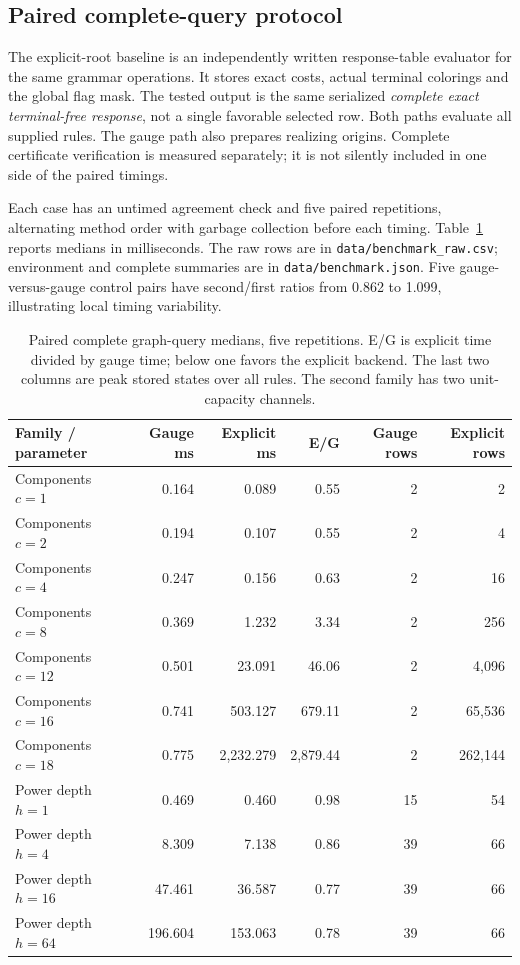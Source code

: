 \documentclass[11pt,letterpaper]{article}
\theoremstyle{definition}
\theoremstyle{remark}\newtheorem{remark}[theorem]{Remark}
\DeclareRobustCommand{\code}[1]{\nolinkurl{#1}}
\begin{document}
\subsection{Paired complete-query protocol}
The explicit-root baseline is an independently written response-table evaluator for the same grammar operations. It stores exact costs, actual terminal colorings and the global flag mask. The tested output is the same serialized \emph{complete exact terminal-free response}, not a single favorable selected row. Both paths evaluate all supplied rules. The gauge path also prepares realizing origins. Complete certificate verification is measured separately; it is not silently included in one side of the paired timings.

Each case has an untimed agreement check and five paired repetitions, alternating method order with garbage collection before each timing. Table~\ref{tab:timing} reports medians in milliseconds. The raw rows are in \code{data/benchmark_raw.csv}; environment and complete summaries are in \code{data/benchmark.json}. Five gauge-versus-gauge control pairs have second/first ratios from 0.862 to 1.099, illustrating local timing variability.

\begin{table}[htbp]
\centering\small
\setlength{\tabcolsep}{5pt}
\begin{tabular}{@{}lrrrrr@{}}
\toprule
Family / parameter & Gauge ms & Explicit ms & E/G & Gauge rows & Explicit rows\\
\midrule
Components $c=1$ & 0.164 & 0.089 & 0.55 & 2 & 2\\
Components $c=2$ & 0.194 & 0.107 & 0.55 & 2 & 4\\
Components $c=4$ & 0.247 & 0.156 & 0.63 & 2 & 16\\
Components $c=8$ & 0.369 & 1.232 & 3.34 & 2 & 256\\
Components $c=12$ & 0.501 & 23.091 & 46.06 & 2 & 4,096\\
Components $c=16$ & 0.741 & 503.127 & 679.11 & 2 & 65,536\\
Components $c=18$ & 0.775 & 2,232.279 & 2,879.44 & 2 & 262,144\\
\midrule
Power depth $h=1$ & 0.469 & 0.460 & 0.98 & 15 & 54\\
Power depth $h=4$ & 8.309 & 7.138 & 0.86 & 39 & 66\\
Power depth $h=16$ & 47.461 & 36.587 & 0.77 & 39 & 66\\
Power depth $h=64$ & 196.604 & 153.063 & 0.78 & 39 & 66\\
\bottomrule
\end{tabular}
\caption{Paired complete graph-query medians, five repetitions. E/G is explicit time divided by gauge time; below one favors the explicit backend. The last two columns are peak stored states over all rules. The second family has two unit-capacity channels.}
\label{tab:timing}
\end{table}
\end{document}
